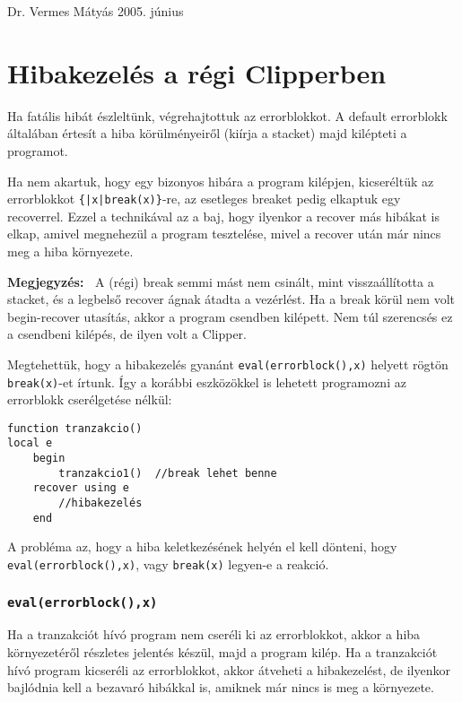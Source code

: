
\setcounter{secnumdepth}{1}  

\def\megj{{\bf Megjegyzés:~}}
\def\szab{{\bf Szabály:~}}
\def\tipus#1{\item {\tt #1~}}

%
{Dr. Vermes Mátyás}%
{2005. június}

\section{Hibakezelés a régi Clipperben}

Ha fatális hibát észleltünk, végrehajtottuk az error\-blokkot.
A default error\-blokk általában értesít a hiba körülményeiről
(kiírja a stacket) majd kilépteti a programot.

Ha nem akartuk, hogy egy bizonyos hibára a program kilépjen,
kicseréltük az errorblokkot \verb!{|x|break(x)}!-re, az esetleges 
breaket pedig elkaptuk egy recoverrel. Ezzel a technikával 
az a baj, hogy  ilyenkor a recover más  hibákat is elkap, 
amivel megnehezül a program tesztelése, mivel a recover után 
már nincs meg a hiba környezete.

\megj
A (régi) break semmi mást nem csinált, mint visszaállította 
a stacket, és a legbelső recover ágnak átadta a vezérlést.
Ha a break körül nem volt begin-recover utasítás, akkor  a program 
csendben kilépett. Nem túl szerencsés ez a csendbeni kilépés, 
de ilyen volt a Clipper.

Megtehettük, hogy a hibakezelés gyanánt \verb!eval(errorblock(),x)! 
helyett rögtön \verb!break(x)!-et írtunk. Így a korábbi eszközökkel is
lehetett programozni az errorblokk cserélgetése nélkül:

\begin{verbatim}
function tranzakcio()
local e
    begin
        tranzakcio1()  //break lehet benne
    recover using e
        //hibakezelés
    end
\end{verbatim}

A probléma az, hogy a hiba keletkezésének helyén el kell dönteni, 
hogy \verb!eval(errorblock(),x)!, vagy \verb!break(x)! legyen-e a reakció. 

\subsubsection{\tt eval(errorblock(),x)}

Ha a tranzakciót hívó program nem cseréli ki az errorblokkot,
akkor a hiba környezetéről részletes jelentés készül, majd
a program kilép. Ha a tranzakciót hívó program kicseréli az 
errorblokkot, akkor átveheti a hibakezelést, de ilyenkor bajlódnia
kell a bezavaró  hibákkal is, amiknek már nincs is meg a környezete.

